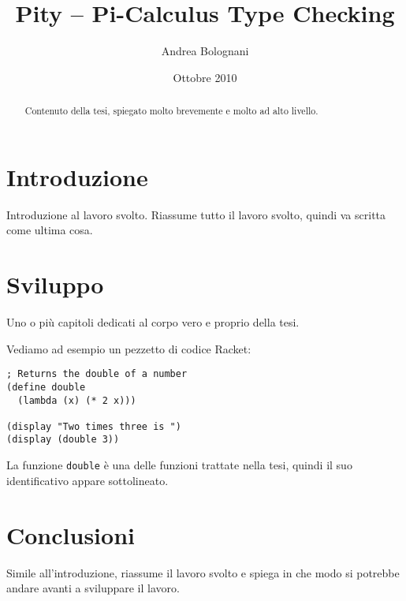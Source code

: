 \documentclass[a4paper]{article}
\begin{document}
\title{Pity -- Pi-Calculus Type Checking}
\author{Andrea Bolognani}
\date{Ottobre 2010}

\maketitle


\begin{abstract}
Contenuto della tesi, spiegato molto brevemente e molto ad alto livello.
\end{abstract}


\clearpage

\tableofcontents

\clearpage


\section{Introduzione}

Introduzione al lavoro svolto. Riassume tutto il lavoro svolto, quindi
va scritta come ultima cosa.







\section{Sviluppo}

Uno o pi\`u capitoli dedicati al corpo vero e proprio della tesi.

Vediamo ad esempio un pezzetto di codice Racket:

\begin{lstlisting}
; Returns the double of a number
(define double
  (lambda (x) (* 2 x)))

(display "Two times three is ")
(display (double 3))
\end{lstlisting}

La funzione \lstinline{double} \`e una delle funzioni trattate nella tesi,
quindi il suo identificativo appare sottolineato.


\section{Conclusioni}

Simile all'introduzione, riassume il lavoro svolto e spiega in che
modo si potrebbe andare avanti a sviluppare il lavoro.
\end{document}
